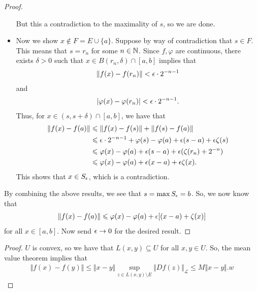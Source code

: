 \documentclass{report}
\begin{document}
\begin{proof}
\begin{itemize}
        But this a contradiction to the maximality of $s$, so we are done.
        \item Now we show $x \notin F = E \cup \{a\}$. Suppose by way of contradiction that $s \in F$. This means that $s = r_n$ for some $n \in \NN$. Since $f ,\varphi$ are continuous, there exists $\delta > 0$ such that $x \in B(r_n, \delta) \cap [a,b]$ implies that 
        \begin{align*}
            \Vert f(x) - f(r_n) \Vert < \epsilon \cdot 2^{-n-1}
        \end{align*}
        and 
        \begin{align*}
            | \varphi(x) - \varphi(r_n) | < \epsilon \cdot 2^{-n-1}.
        \end{align*}
        Thus, for $x \in (s, s + \delta) \cap [a,b]$, we have that 
        \begin{align*}
            \Vert f(x) - f(a) \Vert &\leqslant \Vert f(x) - f(s) \Vert + \Vert f(s) -f(a) \Vert \\
            &\leqslant \epsilon \cdot 2^{-n-1} + \varphi(s) - \varphi(a) + \epsilon(s-a) + \epsilon\zeta(s) \\
            &\leqslant \varphi(x) - \varphi(a) + \epsilon(s-a) + \epsilon(\zeta(r_n) + 2^{-n}) \\
            &\leqslant \varphi(x) - \varphi(a) + \epsilon(x-a) + \epsilon \zeta(x).
        \end{align*}
        This shows that $x \in S_\epsilon$, which is a contradiction.
    \end{itemize}
    By combining the above results, we see that $s = \max S_\epsilon = b$. So, we now know that 
    \begin{align*}
        \Vert f(x) - f(a) \Vert \leqslant \varphi(x) - \varphi(a) + \epsilon[(x-a) + \zeta(x)]
    \end{align*}
    for all $x \in [a,b]$. Now send $\epsilon \to 0$ for the desired result.
\end{proof}
\begin{proof}
    $U$ is convex, so we have that $L(x,y) \subseteq U$ for all $x ,y \in U$. So, the mean value theorem implies that 
    \begin{align*}
        \Vert f(x) - f(y) \Vert \leq \Vert x - y \Vert \sup_{z \in L(x,y) \setminus E} \Vert Df(z) \Vert_{\mathcal L} \leq M \Vert x - y \Vert.w
    \end{align*}
\end{proof}
\end{document}
